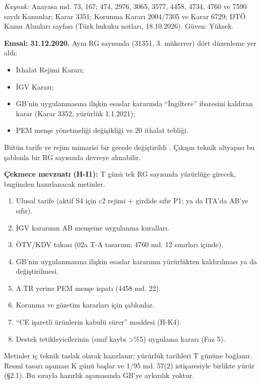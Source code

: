 \endgroup

\emph{Kaynak:} \etiketV{} Anayasa md. 73, 167; 474, 2976, 3065, 3577, 4458, 4734, 4760 ve 7590 sayılı Kanunlar; Karar 3351; Korunma Kararı 2004/7305 ve Karar 6729; DTÖ Kamu Alımları sayfası (Türk hukuku notları, 18.10.2026). Güven: Yüksek.

\textbf{Emsal: 31.12.2020.} Aynı RG sayısında (31351, 3. mükerrer) dört düzenleme yer aldı:

\begin{itemize}
\tightlist
\item
  İthalat Rejimi Kararı;
\item
  İGV Kararı;
\item
  GB'nin uygulanmasına ilişkin esaslar kararında ``İngiltere'' ibaresini kaldıran karar (Karar 3352, yürürlük 1.1.2021);
\item
  PEM menşe yönetmeliği değişikliği ve 20 ithalat tebliği.
\end{itemize}

Bütün tarife ve rejim mimarisi bir gecede değiştirildi \etiketV{}. Çıkışın teknik altyapısı bu şablonla bir RG sayısında devreye alınabilir.

\textbf{Çekmece mevzuatı (H-I1):} T günü tek RG sayısında yürürlüğe girecek, bugünden hazırlanacak metinler.

\begin{enumerate}
\def\labelenumi{\arabic{enumi}.}
\tightlist
\item
  Ulusal tarife (aktif S4 için c2 rejimi + girdide sıfır P1; ya da ITA'da AB'ye sıfır).
\item
  İGV kararının AB menşeine uygulanma kuralları.
\item
  ÖTV/KDV takası (02a T-A tasarımı; 4760 md. 12 sınırları içinde).
\item
  GB'nin uygulanmasına ilişkin esaslar kararının yürürlükten kaldırılması ya da değiştirilmesi.
\item
  A.TR yerine PEM menşe ispatı (4458 md. 22).
\item
  Korunma ve gözetim kararları için şablonlar.
\item
  ``CE işaretli ürünlerin kabulü sürer'' maddesi (H-K4).
\item
  Destek tetikleyicilerinin (sınıf kaybı \textgreater\%5) uygulama kararı (Faz 5).
\end{enumerate}

Metinler iç teknik taslak olarak hazırlanır; yürürlük tarihleri T gününe bağlanır. Resmî tasarı aşaması K günü başlar ve 1/95 md. 57(2) istişaresiyle birlikte yürür (§2.1). Bu sırayla hazırlık aşamasında GB'ye aykırılık yoktur.

